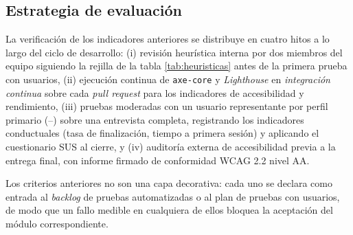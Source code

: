 \subsection{Estrategia de evaluación}

La verificación de los indicadores anteriores se distribuye en cuatro
hitos a lo largo del ciclo de desarrollo: (i) revisión heurística
interna por dos miembros del equipo siguiendo la rejilla de la tabla
\ref{tab:heuristicas} antes de la primera prueba con usuarios,
(ii) ejecución continua de \texttt{axe-core} y \textit{Lighthouse} en
\textit{integración continua} sobre cada \textit{pull request} para
los indicadores de accesibilidad y rendimiento, (iii) pruebas
moderadas con un usuario representante por perfil primario
(--) sobre una entrevista completa, registrando los
indicadores conductuales (tasa de finalización, tiempo a primera
sesión) y aplicando el cuestionario SUS al cierre, y
(iv) auditoría externa de accesibilidad previa a la entrega final, con
informe firmado de conformidad WCAG 2.2 nivel AA.

Los criterios anteriores no son una capa decorativa: cada uno se
declara como entrada al \textit{backlog} de pruebas automatizadas o al
plan de pruebas con usuarios, de modo que un fallo medible en
cualquiera de ellos bloquea la aceptación del módulo correspondiente.
